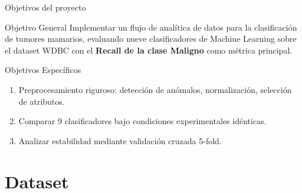 \documentclass[10pt,aspectratio=169]{beamer}
\begin{document}
\begin{frame}{Objetivos del proyecto}
\begin{block}{Objetivo General}
Implementar un flujo de analítica de datos para la clasificación de tumores mamarios, evaluando nueve clasificadores de Machine Learning sobre el dataset WDBC con el \textbf{Recall de la clase Maligno} como métrica principal.
\end{block}

\vspace{1em}
\begin{block}{Objetivos Específicos}
\begin{enumerate}
  \item Preprocesamiento riguroso: detección de anómalos, normalización, selección de atributos.
  \item Comparar 9 clasificadores bajo condiciones experimentales idénticas.
  \item Analizar estabilidad mediante validación cruzada 5-fold.
\end{enumerate}
\end{block}
\end{frame}

\section{Dataset}
\end{document}
